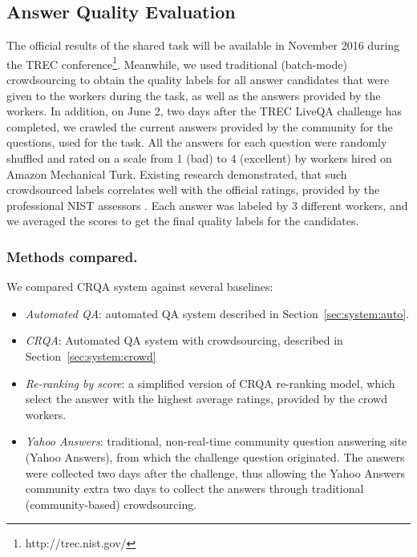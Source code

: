 \documentclass[letterpaper]{article}
\begin{document}
\subsection{Answer Quality Evaluation}
\label{sec:experiments:answer-quality-evaluation}

The official results of the shared task will be available in November 2016 during the TREC conference\footnote{http://trec.nist.gov/}.
Meanwhile, we used traditional (batch-mode) crowdsourcing to obtain the quality labels for all answer candidates that were given to the workers during the task, as well as the answers provided by the workers.
In addition, on June 2, two days after the TREC LiveQA challenge has completed, we crawled the current answers provided by the community for the questions, used for the task.
All the answers for each question were randomly shuffled and rated on a scale from 1 (bad) to 4 (excellent) by workers hired on Amazon Mechanical Turk.
Existing research demonstrated, that such crowdsourced labels correlates well with the official ratings, provided by the professional NIST assessors \cite{savenkov_crowdsourcing2016a}.
Each answer was labeled by 3 different workers, and we averaged the scores to get the final quality labels for the candidates.


\subsubsection{Methods compared.}
We compared CRQA system against several baselines:
\begin{itemize}
\item \textit{Automated QA}: automated QA system described in Section~\ref{sec:system:auto}.
\item \textit{CRQA}: Automated QA system with crowdsourcing, described in Section~\ref{sec:system:crowd}
\item \textit{Re-ranking by score}: a simplified version of CRQA re-ranking model, which select the answer with the highest average ratings, provided by the crowd workers.
\item \textit{Yahoo Answers}: traditional, non-real-time community question answering site (Yahoo Answers), from which the challenge question originated. The answers were collected two days after the challenge, thus allowing the Yahoo Answers community extra two days to collect the answers through traditional (community-based) crowdsourcing.
\end{itemize}
\end{document}
